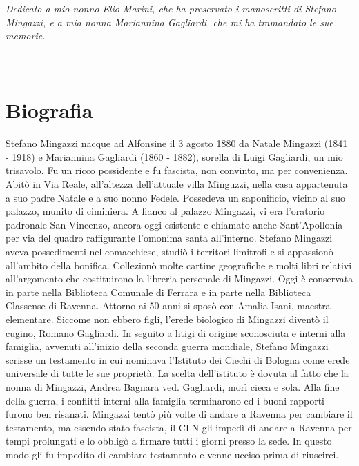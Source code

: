 \documentclass[10pt]{memoir} %
\begin{document}


\chapter*{}

\emph{Dedicato a mio nonno Elio Marini, che ha preservato i manoscritti di Stefano Mingazzi, e a mia nonna Mariannina Gagliardi, che mi ha tramandato le sue memorie.\\}
\\
\\
\normalsize


\frontmatter


\chapter*{Biografia}
Stefano Mingazzi nacque ad Alfonsine il 3 agosto 1880 da Natale Mingazzi (1841 - 1918) e Mariannina Gagliardi (1860 - 1882), sorella di Luigi Gagliardi, un mio trisavolo. Fu un ricco possidente e fu fascista, non convinto, ma per convenienza. Abitò in Via Reale, all'altezza dell'attuale villa Minguzzi, nella casa appartenuta a suo padre Natale e a suo nonno Fedele. Possedeva un saponificio, vicino al suo palazzo, munito di ciminiera. A fianco al palazzo Mingazzi, vi era l'oratorio padronale San Vincenzo, ancora oggi esistente e chiamato anche Sant'Apollonia per via del quadro raffigurante l'omonima santa all'interno.
Stefano Mingazzi aveva possedimenti nel comacchiese, studiò i territori limitrofi e si appassionò all'ambito della bonifica. Collezionò molte cartine geografiche e molti libri relativi all'argomento che costituirono la libreria personale di Mingazzi. Oggi è conservata in parte nella Biblioteca Comunale di Ferrara e in parte nella Biblioteca Classense di Ravenna.
Attorno ai 50 anni si sposò con Amalia Isani, maestra elementare. Siccome non ebbero figli, l'erede biologico di Mingazzi diventò il cugino, Romano Gagliardi. In seguito a litigi di origine sconosciuta e interni alla famiglia, avvenuti all'inizio della seconda guerra mondiale, Stefano Mingazzi scrisse un testamento in cui nominava l'Istituto dei Ciechi di Bologna come erede universale di tutte le sue proprietà. La scelta dell'istituto è dovuta al fatto che la nonna di Mingazzi, Andrea Bagnara ved. Gagliardi, morì cieca e sola. Alla fine della guerra, i conflitti interni alla famiglia terminarono ed i buoni rapporti furono ben risanati. Mingazzi tentò più volte di andare a Ravenna per cambiare il testamento, ma essendo stato fascista, il CLN gli impedì di andare a Ravenna per tempi prolungati e lo obbligò a firmare tutti i giorni presso la sede. In questo modo gli fu impedito di cambiare testamento e venne ucciso prima di riuscirci.
\end{document}
